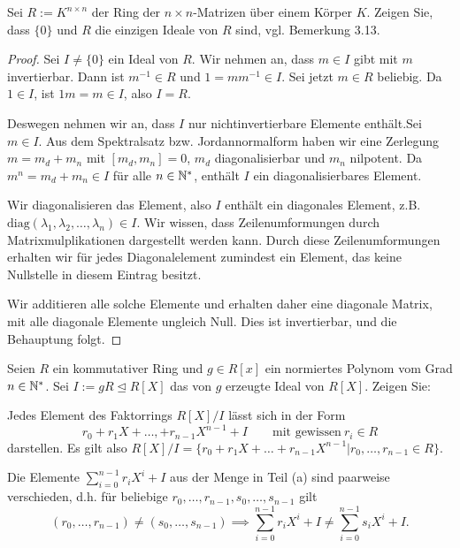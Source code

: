 \begin{Problem}
	Sei $R:=K^{n\times n}$ der Ring der $n\times n$-Matrizen über einem Körper $K$. Zeigen Sie, dass $\{0\} $ und $R$ die einzigen Ideale von $R$ sind, vgl. Bemerkung 3.13.
\end{Problem}
\begin{proof}
	Sei $I\neq \{0\} $ ein Ideal von $R$. Wir nehmen an, dass $m\in I$ gibt mit $m$ invertierbar. Dann ist $m^{-1}\in R$ und $1 = m m^{-1}\in I$. Sei jetzt $m\in R$ beliebig. Da $1\in I$, ist $1m=m\in I$, also $I=R$.

	Deswegen nehmen wir an, dass $I$ nur nichtinvertierbare Elemente enthält.Sei $m\in I$. Aus dem Spektralsatz bzw. Jordannormalform haben wir eine Zerlegung $m=m_d+m_n$ mit $[m_d,m_n]=0$, $m_d$ diagonalisierbar und $m_n$ nilpotent. Da $m^n=m_d+m_n\in I$ f\"{u}r alle $n\in \mathbb{N}^*$, enthält $I$ ein diagonalisierbares Element. 

	Wir diagonalisieren das Element, also $I$ enthält ein diagonales Element, z.B. $\text{diag}(\lambda_1,\lambda_2,\dots, \lambda_n)\in I$. Wir wissen, dass Zeilenumformungen durch Matrixmulplikationen dargestellt werden kann. Durch diese Zeilenumformungen erhalten wir f\"{u}r jedes Diagonalelement zumindest ein Element, das keine Nullstelle in diesem Eintrag besitzt. 

	Wir additieren alle solche Elemente und erhalten daher eine diagonale Matrix, mit alle diagonale Elemente ungleich Null. Dies ist invertierbar, und die Behauptung folgt.
\end{proof}
\begin{Problem}
	Seien $R$ ein kommutativer Ring und $g\in R[x]$ ein normiertes Polynom vom Grad $n\in \mathbb{N}^*$. Sei $I:=gR\trianglelefteq R[X]$ das von $g$ erzeugte Ideal von $R[X]$. Zeigen Sie:
	\begin{parts}
		\item Jedes Element des Faktorrings $R[X] / I$ lässt sich in der Form
			\[
				r_0+r_1X+\dots, +r_{n-1}X^{n-1}+I\qquad\text{mit gewissen}~r_i\in R
			\]
			darstellen. Es gilt also $R[X] / I=\{r_0+r_1X+\dots+r_{n-1}X^{n-1}|r_0,\dots, r_{n-1}\in R\} $.
		\item Die Elemente $\sum_{i=0}^{n-1}r_i X^i +I$ aus der Menge in Teil (a) sind paarweise verschieden, d.h. f\"{u}r beliebige $r_0,\dots, r_{n-1},s_0,\dots, s_{n-1}$ gilt
			\[
				(r_0,\dots, r_{n-1})\neq (s_0,\dots, s_{n-1})\implies \sum_{i=0}^{n-1} r_i X^i+I\neq \sum_{i=0}^{n-1}s_i X^i+I
			.\] 
	\end{parts}
\end{Problem}
